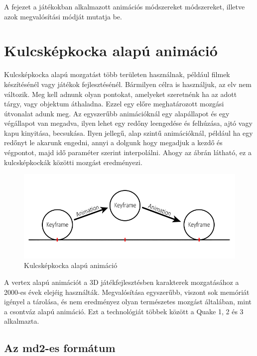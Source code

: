 \label{Chap:animacio}

A fejezet a játékokban alkalmazott animációs módszereket módszereket, illetve azok megvalósítási módját mutatja be.

\section{Kulcsképkocka alapú animáció}

Kulcsképkocka alapú mozgatást több területen használnak, például filmek készítésénél vagy játékok fejlesztésénél. Bármilyen célra is használjuk, az elv nem változik. Meg kell adnunk olyan pontokat, amelyeket szeretnénk ha az adott tárgy, vagy objektum áthaladna. Ezzel egy előre meghatározott mozgási útvonalat adunk meg. Az egyszerűbb animációknál egy alapállapot és egy végállapot van megadva, ilyen lehet egy redőny leengedése és felhúzása, ajtó vagy kapu kinyitása, becsukása. Ilyen jellegű, alap szintű animációknál, például ha egy redőnyt le akarunk engedni, annyi a dolgunk hogy megadjuk a kezdő és végpontot, majd idő paraméter szerint interpolálni. Ahogy az  ábrán látható, ez a kulcsképkockák közötti mozgást eredményezi.

\begin{figure}[h]
\centering
\includegraphics[scale=0.5]{kepek/keyframe_anim.png}
\caption{Kulcsképkocka alapú animáció}
\label{fig:keyframe}
\end{figure}

A vertex alapú animációt a 3D játékfejlesztésben karakterek mozgatásához a 2000-es évek elejéig használták. Megvalósítása egyszerűbb, viszont sok memóriát igényel a tárolása, és nem eredményez olyan természetes mozgást általában, mint a csontváz alapú animáció. Ezt a technológiát többek között a Quake 1, 2 és 3 alkalmazta.

\subsection{Az md2-es formátum}

